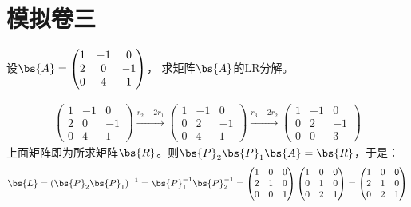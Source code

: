 \documentclass[12pt, a4paper, oneside, UTF8]{ctexbook}
\begin{document}
\else
\fi

\chapter{模拟卷三}
\begin{question} 
   设$\bs{A}=\begin{pmatrix}
    1&-1&0\\
    2&0&-1\\
    0&4&1
   \end{pmatrix}$，
   求矩阵$\bs{A}$的LR分解。
\end{question}

\begin{solution}
    \begin{align*}
        \begin{pmatrix}
            1&-1&0\\
            2&0&-1\\
            0&4&1
           \end{pmatrix}\xrightarrow[]{r_2-2r_1}
           \begin{pmatrix}
            1&-1&0\\
            0&2&-1\\
            0&4&1
           \end{pmatrix}\xrightarrow[]{r_3-2r_2}
           \begin{pmatrix}
            1&-1&0\\
            0&2&-1\\
            0&0&3
           \end{pmatrix}
    \end{align*}
    上面矩阵即为所求矩阵$\bs{R}$。则$\bs{P}_2\bs{P}_1\bs{A}=\bs{R}$，于是：
    \begin{align*}
        \bs{L}=(\bs{P}_2\bs{P}_1)^{-1}=\bs{P}_1^{-1}\bs{P}_2^{-1}
        =\begin{pmatrix}
            1&0&0\\
            2&1&0\\
            0&0&1
        \end{pmatrix}
        \begin{pmatrix}
            1&0&0\\
            0&1&0\\
            0&2&1
        \end{pmatrix}=\begin{pmatrix}
            1&0&0\\
            2&1&0\\
            0&2&1

\end{pmatrix}
\end{align*}
\end{solution}
\end{document}
